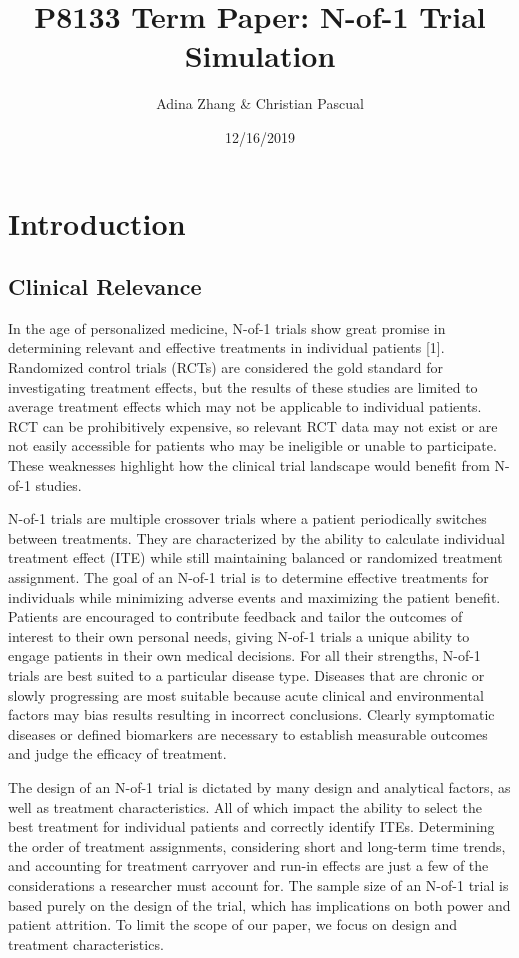 \documentclass[11pt,]{article}
\title{P8133 Term Paper: N-of-1 Trial Simulation}
\author{Adina Zhang \& Christian Pascual}
\date{12/16/2019}
\begin{document}
\maketitle

\section{Introduction}\label{introduction}

\subsection{Clinical Relevance}\label{clinical-relevance}

In the age of personalized medicine, N-of-1 trials show great promise in
determining relevant and effective treatments in individual patients
{[}1{]}. Randomized control trials (RCTs) are considered the gold
standard for investigating treatment effects, but the results of these
studies are limited to average treatment effects which may not be
applicable to individual patients. RCT can be prohibitively expensive,
so relevant RCT data may not exist or are not easily accessible for
patients who may be ineligible or unable to participate. These
weaknesses highlight how the clinical trial landscape would benefit from
N-of-1 studies.

N-of-1 trials are multiple crossover trials where a patient periodically
switches between treatments. They are characterized by the ability to
calculate individual treatment effect (ITE) while still maintaining
balanced or randomized treatment assignment. The goal of an N-of-1 trial
is to determine effective treatments for individuals while minimizing
adverse events and maximizing the patient benefit. Patients are
encouraged to contribute feedback and tailor the outcomes of interest to
their own personal needs, giving N-of-1 trials a unique ability to
engage patients in their own medical decisions. For all their strengths,
N-of-1 trials are best suited to a particular disease type. Diseases
that are chronic or slowly progressing are most suitable because acute
clinical and environmental factors may bias results resulting in
incorrect conclusions. Clearly symptomatic diseases or defined
biomarkers are necessary to establish measurable outcomes and judge the
efficacy of treatment.

The design of an N-of-1 trial is dictated by many design and analytical
factors, as well as treatment characteristics. All of which impact the
ability to select the best treatment for individual patients and
correctly identify ITEs. Determining the order of treatment assignments,
considering short and long-term time trends, and accounting for
treatment carryover and run-in effects are just a few of the
considerations a researcher must account for. The sample size of an
N-of-1 trial is based purely on the design of the trial, which has
implications on both power and patient attrition. To limit the scope of
our paper, we focus on design and treatment characteristics.
\end{document}
